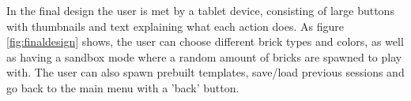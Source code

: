 In the final design the user is met by a tablet device, consisting of large buttons with thumbnails and text explaining what each action does. As figure \ref{fig:finaldesign} shows, the user can choose different brick types and colors, as well as having a sandbox mode where a random amount of bricks are spawned to play with. The user can also spawn prebuilt templates, save/load previous sessions and go back to the main menu with a 'back' button. 

